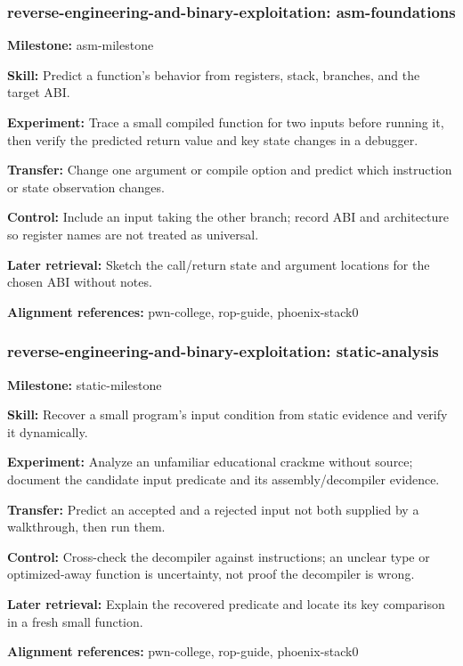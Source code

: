\subsubsection{reverse-engineering-and-binary-exploitation: asm-foundations}
\noindent\textbf{Milestone:} asm-milestone\par
\noindent\textbf{Skill:} Predict a function’s behavior from registers, stack, branches, and the target ABI.\par
\noindent\textbf{Experiment:} Trace a small compiled function for two inputs before running it, then verify the predicted return value and key state changes in a debugger.\par
\noindent\textbf{Transfer:} Change one argument or compile option and predict which instruction or state observation changes.\par
\noindent\textbf{Control:} Include an input taking the other branch; record ABI and architecture so register names are not treated as universal.\par
\noindent\textbf{Later retrieval:} Sketch the call/return state and argument locations for the chosen ABI without notes.\par
\noindent\textbf{Alignment references:} pwn-college, rop-guide, phoenix-stack0\par
\subsubsection{reverse-engineering-and-binary-exploitation: static-analysis}
\noindent\textbf{Milestone:} static-milestone\par
\noindent\textbf{Skill:} Recover a small program’s input condition from static evidence and verify it dynamically.\par
\noindent\textbf{Experiment:} Analyze an unfamiliar educational crackme without source; document the candidate input predicate and its assembly/decompiler evidence.\par
\noindent\textbf{Transfer:} Predict an accepted and a rejected input not both supplied by a walkthrough, then run them.\par
\noindent\textbf{Control:} Cross-check the decompiler against instructions; an unclear type or optimized-away function is uncertainty, not proof the decompiler is wrong.\par
\noindent\textbf{Later retrieval:} Explain the recovered predicate and locate its key comparison in a fresh small function.\par
\noindent\textbf{Alignment references:} pwn-college, rop-guide, phoenix-stack0\par
